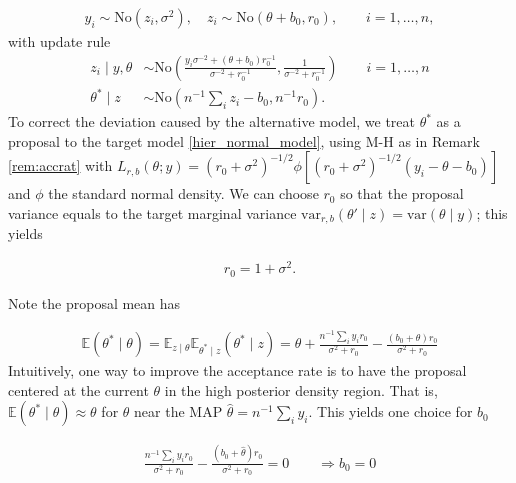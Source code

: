 \documentclass[twoside,11pt]{article}
\newcommand{\No}{\text{No}}
\newcommand{\1}{\mathbf 1}
\begin{document}
{\begin{equation*}
	\begin{aligned}
    y_i \sim \No(z_i, \sigma^2), \quad z_i\sim \No(\theta+b_0,r_0), \qquad i=1,\ldots,n,
	\end{aligned}
\end{equation*}
with update rule
\begin{equation}
\label{hier_model_proposal}
	\begin{aligned}
    z_i \mid y,\theta&\sim \No \left(\frac{y_i\sigma^{-2}+(\theta+b_0)r_0^{-1}}{\sigma^{-2}+r_0^{-1}}, \frac{1}{\sigma^{-2}+r_0^{-1}} \right) \qquad i=1,\ldots,n \\
    \theta^* \mid z & \sim \No({n}^{-1}{\sum_i z_i}-b_0 , {n}^{-1}r_0).
	\end{aligned}
\end{equation}
To  correct the deviation caused by the alternative model, we treat $\theta^*$ as a proposal to the target model \eqref{hier_normal_model}, using M-H as in Remark \ref{rem:accrat} with $L_{r,b}(\theta;y)= (r_0 + \sigma^2)^{-1/2}\phi[ (r_0 + \sigma^2)^{-1/2}(y_i - \theta - b_0)]$ and $\phi$ the standard normal density. We can choose $r_0$ so that the proposal variance equals to the target marginal variance $\mbox{var}_{r,b}(\theta'\mid z) = \mbox{var}(\theta\mid y) $; this yields

\begin{equation*}
	\begin{aligned}
    r_0=1+\sigma^2.
	\end{aligned}
\end{equation*}

Note the proposal mean has

\begin{equation*}
	\begin{aligned}
        \mathbb{E} (\theta^* \mid \theta)=\mathbb{E}_{z\mid \theta} \mathbb{E}_{\theta^*\mid z} (\theta^*\mid z)= \theta + {\frac{n^{-1}\sum_i y_ir_0 }{\sigma^{2}+r_0}- \frac{(b_0 + \theta)r_0}{\sigma^{2}+r_0} }
	\end{aligned}
\end{equation*}
Intuitively, one way to improve the acceptance rate is to have the proposal centered at the current $\theta$ in the high posterior density region. That is, $  \mathbb{E} (\theta^*\mid \theta)\approx \theta$ for $\theta$ near the MAP $\hat\theta = n^{-1}\sum_i y_i$. This yields one choice for $b_0$

\begin{equation*}
	\begin{aligned}
    \frac{n^{-1}\sum_i y_ir_0 }{\sigma^{2}+r_0}- \frac{(b_0 + \hat\theta)r_0}{\sigma^{2}+r_0} =0 \qquad \Rightarrow b_0=0
	\end{aligned}
\end{equation*}

}
\end{document}
